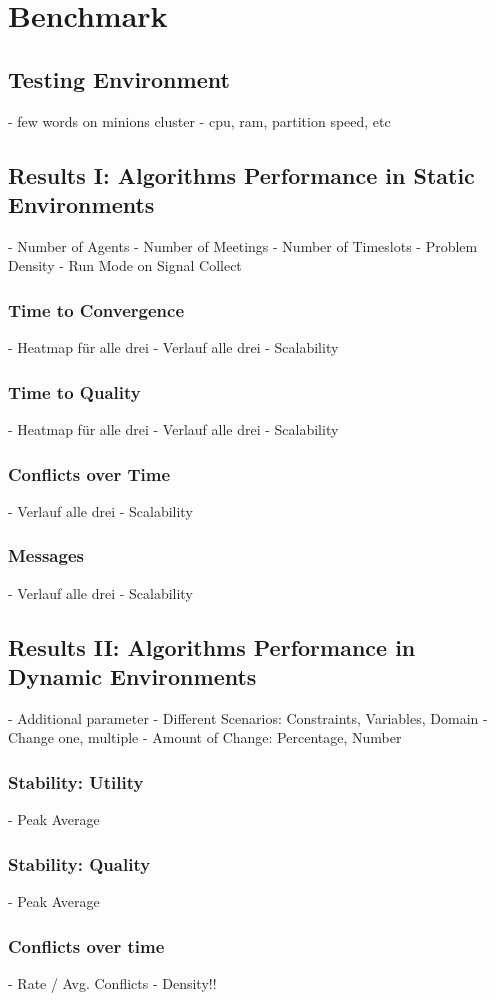 \chapter{Benchmark}

\section{Testing Environment}

- few words on minions cluster
- cpu, ram, partition speed, etc

\section{Results I: Algorithms Performance in Static Environments}

- Number of Agents
- Number of Meetings
- Number of Timeslots
- Problem Density
- Run Mode on Signal Collect

\subsection{Time to Convergence}
- Heatmap für alle drei
- Verlauf alle drei
- Scalability
\subsection{Time to Quality}
- Heatmap für alle drei
- Verlauf alle drei
- Scalability
\subsection{Conflicts over Time}
- Verlauf alle drei
- Scalability
\subsection{Messages}
-  Verlauf alle drei
- Scalability

\section{Results II: Algorithms Performance in Dynamic Environments}

- Additional parameter
- Different Scenarios: Constraints, Variables, Domain
- Change one, multiple
- Amount of Change: Percentage, Number

\subsection{Stability: Utility}
- Peak Average
\subsection{Stability: Quality}
- Peak Average
\subsection{Conflicts over time}
- Rate / Avg. Conflicts - Density!!


